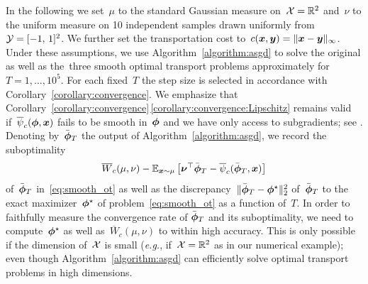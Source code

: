 \documentclass[11pt, a4paper, oneside, reqno]{article}
\begin{document}
     In the following we set~$\mu$ to the standard Gaussian measure on~$\mathcal X= \mathbb{R}^2$ and~$\nu$ to the uniform measure on 10 independent samples drawn uniformly from~$\mathcal Y=[-1,\, 1]^2$. We further set the transportation cost to~$c(\boldsymbol x, \boldsymbol y) = \|\boldsymbol x - \boldsymbol y\|_\infty$. Under these assumptions, we use Algorithm~\ref{algorithm:asgd} to solve the original as well as the~{\color{black}three} smooth optimal transport problems approximately {\color{black} for $T=1,\ldots, 10^5$. For each fixed~$T$ the step size is selected in accordance with Corollary~\ref{corollary:convergence}.}
     We emphasize that Corollary~\ref{corollary:convergence}\,\ref{corollary:convergence:Lipschitz} remains valid if~$\overline \psi_c(\boldsymbol \phi,\boldsymbol x)$ fails to be smooth in~$\boldsymbol \phi$ and we have only access to subgradients; see \cite[Corollary~1]{nesterov2008confidence}. Denoting by~$\bar{\boldsymbol \phi}_T$ the output of Algorithm~\ref{algorithm:asgd}, we record the suboptimality
	 \begin{equation*}
	     \overline W_c(\mu, \nu) - \mathbb{E}_{\bs x \sim \mu} \left[ \bs \nu^\top \bar{\bs \phi}_T - \overline\psi_c(\bar{\bs \phi}_T , \bs x)\right] %
	 \end{equation*}
     of~$\bar{\boldsymbol \phi}_T$ in~\eqref{eq:smooth_ot} as well as the discrepancy~$\| \bar {\boldsymbol \phi}_T - \boldsymbol \phi^\star \|^2_2$ of~$\bar{\boldsymbol \phi}_T$ to the exact maximizer~$\boldsymbol \phi^\star$ of problem~\eqref{eq:smooth_ot} as a function of~$T$. In order to faithfully measure the convergence rate of $\bar{\boldsymbol \phi}_T$ and its suboptimality, we need to compute~$\boldsymbol \phi^\star$ as well as~$\overline W_c(\mu, \nu)$ to within high accuracy. This is only possible if the dimension of~$\mathcal X$ is small ({\em e.g.}, if~$\mathcal X= \mathbb{R}^2$ as in our numerical example); even though Algorithm~\ref{algorithm:asgd} can efficiently solve optimal transport problems in high dimensions.
\end{document}
